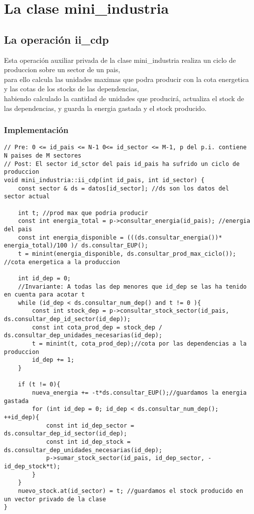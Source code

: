 \documentclass[10pt]{article}
\begin{document}
\newpage

\section{La clase mini\_industria}
\subsection{La operación ii\_cdp}
Esta operación auxiliar privada de la clase mini\_industria realiza un ciclo de produccion sobre un sector de un pais,\\
para ello calcula las unidades maximas que podra producir con la cota energetica y las cotas de los stocks de las dependencias,\\
habiendo calculado la cantidad de unidades que producirá, actualiza el stock de las dependencias, y guarda la energia gastada y el stock producido.
\subsubsection{Implementación}
\begin{lstlisting}
// Pre: 0 <= id_pais <= N-1 0<= id_sector <= M-1, p del p.i. contiene N paises de M sectores
// Post: El sector id_sctor del pais id_pais ha sufrido un ciclo de produccion 
void mini_industria::ii_cdp(int id_pais, int id_sector) {
	const sector & ds = datos[id_sector]; //ds son los datos del sector actual

	int t; //prod max que podria producir
	const int energia_total = p->consultar_energia(id_pais); //energia del pais
	const int energia_disponible = (((ds.consultar_energia())* energia_total)/100 )/ ds.consultar_EUP();
	t = minint(energia_disponible, ds.consultar_prod_max_ciclo()); //cota energetica a la produccion

	int id_dep = 0;
	//Invariante: A todas las dep menores que id_dep se las ha tenido en cuenta para acotar t
	while (id_dep < ds.consultar_num_dep() and t != 0 ){
		const int stock_dep = p->consultar_stock_sector(id_pais, ds.consultar_dep_id_sector(id_dep));
		const int cota_prod_dep = stock_dep / ds.consultar_dep_unidades_necesarias(id_dep);
		t = minint(t, cota_prod_dep);//cota por las dependencias a la produccion 
		id_dep += 1;
	}
	
	if (t != 0){
		nueva_energia += -t*ds.consultar_EUP();//guardamos la energia gastada  
		for (int id_dep = 0; id_dep < ds.consultar_num_dep(); ++id_dep){
			const int id_dep_sector = ds.consultar_dep_id_sector(id_dep);
			const int id_dep_stock = ds.consultar_dep_unidades_necesarias(id_dep);
			p->sumar_stock_sector(id_pais, id_dep_sector, -id_dep_stock*t);
		}
	}
	nuevo_stock.at(id_sector) = t; //guardamos el stock producido en un vector privado de la clase
}
\end{lstlisting}
\end{document}
